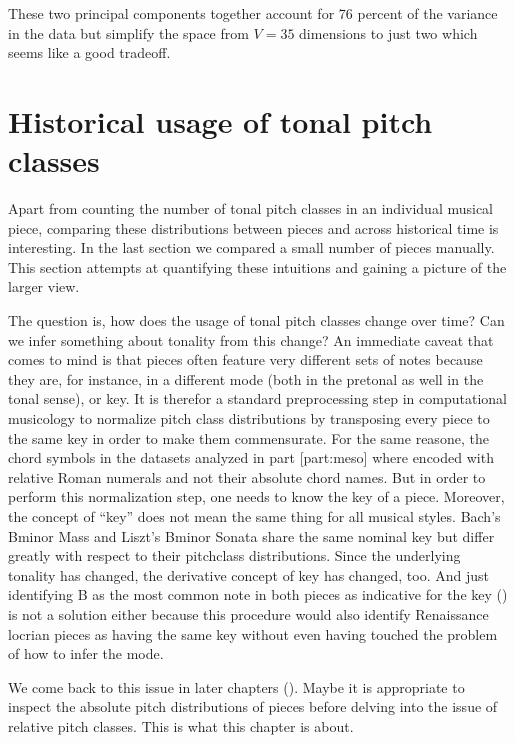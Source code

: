 \documentclass[letterpaper,10pt,english]{sphinxmanual}
\begin{document}
\sphinxAtStartPar
These two principal components together account for 76 percent of the
variance in the data but simplify the space from \(V=35\) dimensions
to just two which seems like a good tradeoff.


\chapter{Historical usage of tonal pitch classes}
\label{\detokenize{history:historical-usage-of-tonal-pitch-classes}}\label{\detokenize{history::doc}}
\sphinxAtStartPar
Apart from counting the number of tonal pitch classes in an individual
musical piece, comparing these distributions between pieces and across
historical time is interesting. In the last section we compared a small
number of pieces manually. This section attempts at quantifying these
intuitions and gaining a picture of the larger view.

\sphinxAtStartPar
The question is, how does the usage of tonal pitch classes change over
time? Can we infer something about tonality from this change? An
immediate caveat that comes to mind is that pieces often feature very
different sets of notes because they are, for instance, in a different
mode (both in the pre\sphinxhyphen{}tonal as well in the tonal sense), or key. It is
therefor a standard preprocessing step in computational musicology to
normalize pitch class distributions by transposing every piece to the
same key in order to make them commensurate. For the same reasone, the
chord symbols in the datasets analyzed in part {[}part:meso{]} where encoded
with relative Roman numerals and not their absolute chord names. But in
order to perform this normalization step, one needs to know the key of a
piece.  Moreover, the concept
of “key” does not mean the same thing for all musical styles. Bach’s
B\sphinxhyphen{}minor Mass and Liszt’s B\sphinxhyphen{}minor Sonata share the same nominal key but
differ greatly with respect to their pitch\sphinxhyphen{}class distributions. Since
the underlying tonality has changed, the derivative concept of key has
changed, too. And just identifying B as the most common note in both
pieces as indicative for the key () is not
a solution either because this procedure would also identify Renaissance
locrian pieces as having the same key without even having touched the
problem of how to infer the mode.

\sphinxAtStartPar
We come back to this issue in later chapters (). Maybe it is
appropriate to inspect the absolute pitch distributions of pieces before
delving into the issue of relative pitch classes. This is what this
chapter is about.
\end{document}
